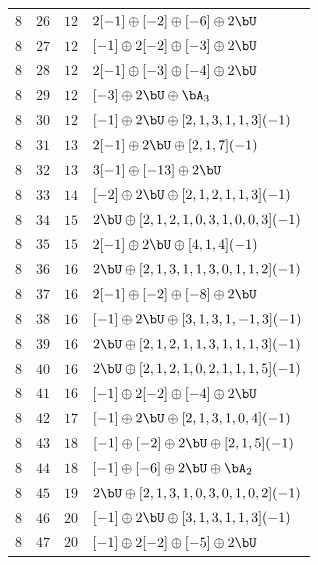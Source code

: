 \begin{center}
\begin{longtable}{llll}
 \(8\) & \(26\) & \(12\) & \(2 [-1] \oplus [-2] \oplus [-6] \oplus 2 \bU\) \\
 \(8\) & \(27\) & \(12\) & \([-1] \oplus 2 [-2] \oplus [-3] \oplus 2 \bU\) \\
 \(8\) & \(28\) & \(12\) & \(2 [-1] \oplus [-3] \oplus [-4] \oplus 2 \bU\) \\
 \(8\) & \(29\) & \(12\) & \([-3] \oplus 2 \bU \oplus \bA_{3}\) \\
 \(8\) & \(30\) & \(12\) & \([-1] \oplus 2 \bU \oplus [2, 1, 3, 1, 1, 3](-1)\) \\
 \(8\) & \(31\) & \(13\) & \(2 [-1] \oplus 2 \bU \oplus [2, 1, 7](-1)\) \\
 \(8\) & \(32\) & \(13\) & \(3 [-1] \oplus [-13] \oplus 2 \bU\) \\
 \(8\) & \(33\) & \(14\) & \([-2] \oplus 2 \bU \oplus [2, 1, 2, 1, 1, 3](-1)\) \\
 \(8\) & \(34\) & \(15\) & \(2 \bU \oplus [2, 1, 2, 1, 0, 3, 1, 0, 0, 3](-1)\) \\
 \(8\) & \(35\) & \(15\) & \(2 [-1] \oplus 2 \bU \oplus [4, 1, 4](-1)\) \\
 \(8\) & \(36\) & \(16\) & \(2 \bU \oplus [2, 1, 3, 1, 1, 3, 0, 1, 1, 2](-1)\) \\
 \(8\) & \(37\) & \(16\) & \(2 [-1] \oplus [-2] \oplus [-8] \oplus 2 \bU\) \\
 \(8\) & \(38\) & \(16\) & \([-1] \oplus 2 \bU \oplus [3, 1, 3, 1, -1, 3](-1)\) \\
 \(8\) & \(39\) & \(16\) & \(2 \bU \oplus [2, 1, 2, 1, 1, 3, 1, 1, 1, 3](-1)\) \\
 \(8\) & \(40\) & \(16\) & \(2 \bU \oplus [2, 1, 2, 1, 0, 2, 1, 1, 1, 5](-1)\) \\
 \(8\) & \(41\) & \(16\) & \([-1] \oplus 2 [-2] \oplus [-4] \oplus 2 \bU\) \\
 \(8\) & \(42\) & \(17\) & \([-1] \oplus 2 \bU \oplus [2, 1, 3, 1, 0, 4](-1)\) \\
 \(8\) & \(43\) & \(18\) & \([-1] \oplus [-2] \oplus 2 \bU \oplus [2, 1, 5](-1)\) \\
 \(8\) & \(44\) & \(18\) & \([-1] \oplus [-6] \oplus 2 \bU \oplus \bA_{2}\) \\
 \(8\) & \(45\) & \(19\) & \(2 \bU \oplus [2, 1, 3, 1, 0, 3, 0, 1, 0, 2](-1)\) \\
 \(8\) & \(46\) & \(20\) & \([-1] \oplus 2 \bU \oplus [3, 1, 3, 1, 1, 3](-1)\) \\
 \(8\) & \(47\) & \(20\) & \([-1] \oplus 2 [-2] \oplus [-5] \oplus 2 \bU\) \\

\end{longtable}
\end{center}
